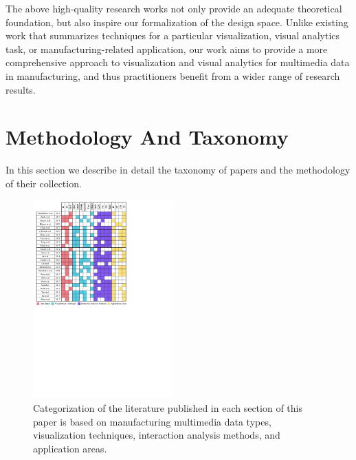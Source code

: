\documentclass[a4paper,fleqn]{cas-dc}
\begin{document}
The above high-quality research works not only provide an adequate theoretical foundation, but also inspire our formalization of the design space. Unlike existing work that summarizes techniques for a particular visualization, visual analytics task, or manufacturing-related application, our work aims to provide a more comprehensive approach to visualization and visual analytics for multimedia data in manufacturing, and thus practitioners benefit from a wider range of research results.

\section{Methodology And Taxonomy}
In this section we describe in detail the taxonomy of papers and the methodology of their collection.  
 
\begin{figure}[pos=t]
	\centering
	\vspace{.5em}
	\includegraphics[width=0.48\textwidth]{Images/table.pdf}
	\caption{Categorization of the literature published in each section of this paper is based on manufacturing multimedia data types, visualization techniques, interaction analysis methods, and application areas.}
	\vspace{-1em}
	\label{table}
\end{figure}
 
\end{document}
